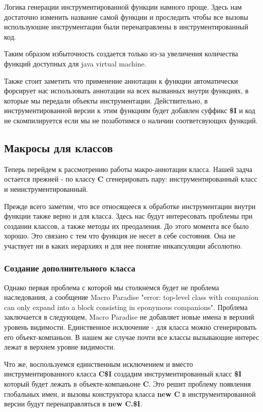 Логика генерации инструментированной функции намного проще.
Здесь нам достаточно изменить название самой функции и проследить чтобы все
вызовы используюшие инструментации были перенаправлены в инструментированный
код.

Таким образом избыточность создается только из-за увеличения количества функций
доступных для java virtual machine.

Также стоит заметить что применение аннотации к функции автоматически форсирует
нас использовать аннотации на всех вызванных внутри функциях, в которые мы передали
объекты инструментации.
Действительно, в инструментированной версии к этим функциям будет добавлен
суффикс \textbf{\$I} и код не скомпилируется если мы не позаботимся о наличии
соответсвующих функций.

\subsection{Макросы для классов}
\label{sec:macroClass}
Теперь перейдем к рассмотрению работы макро-аннотации класса.
Нашей задча остается прежней - по классу \textbf{C} сгенерировать пару:
инструментированный класс и неинструментированный.

Прежде всего заметим, что все относящееся к обработке инструментации внутри
функции также верно и для класса.
Здесь нас будут интересовать проблемы при создании классов, а также методы
их преодаления.
До этого момента все было хорошо.
Это связано с тем что функция не несет в себе состояния.
Она не участвует ни в каких иерархиях и для нее понятие инкапсуляции абсолютно.

\subsubsection{Создание дополнительного класса}

Однако первая проблема с которой мы столкнемся будет не проблема наследования,
а сообщение Macro Paradise
"error: top-level class with companion can only expand into a block consisting
in eponymous companions".
Проблема заключается в следующем, Macro Paradise не добавляет новые имена в
верхний уровень видимости.
Единственное исключение - для класса можно сгенерировать его объект-компаньон.
В нашем же случае почти все классы вызывающие интерес лежат в верхнем уровне
видимости.

Что же, воспользуемся единственным исключением и вместо инструментированного
класса \textbf{C\$I} создадим инструментированный класс \textbf{\$I} который
будет лежать в объекте-компаньоне \textbf{C}.
Это решит проблему появления глобальных имен, и вызовы конструктора класса
\textbf{new C} в инструментированной версии будут перенаправляться
в \textbf{new C.\$I}.

